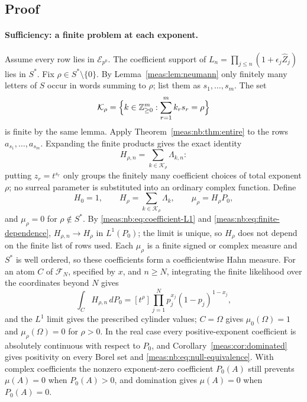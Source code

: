 \documentclass[11pt]{article}
\numberwithin{equation}{section}
\theoremstyle{definition}
\theoremstyle{remark}
\newcommand{\Z}{\mathbb Z}
\newcommand{\coef}[2]{[t^{#1}]#2}
\newcommand{\Zh}{\widehat Z}
\newcommand{\Erow}{\mathcal E_{p^0}}
\begin{document}
\subsection{Proof}

\paragraph{Sufficiency: a finite problem at each exponent.} Assume every row lies
in $\Erow$. The coefficient support of $L_n=\prod_{j\le n}(1+\epsilon_j\Zh_j)$ lies in
$S^*$. Fix $\rho\in S^*\setminus\{0\}$. By Lemma~\ref{meas:lem:neumann} only finitely
many letters of $S$ occur in words summing to $\rho$; list them as
$s_1,\ldots,s_m$. The set
\begin{equation}\label{meas:nb:eq:K-rho}
 \mathcal K_\rho=\Bigl\{k\in\Z_{\ge0}^m:\sum_{r=1}^mk_rs_r=\rho\Bigr\}
\end{equation}
is finite by the same lemma. Apply Theorem~\ref{meas:nb:thm:entire} to the rows
$a_{s_1},\ldots,a_{s_m}$. Expanding the finite products gives the exact identity
\begin{equation}\label{meas:nb:eq:finite-dependence}
 H_{\rho,n}=\sum_{k\in\mathcal K_\rho}\Lambda_{k,n}:
\end{equation}
putting $z_r=t^{s_r}$ only groups the finitely many coefficient choices of total
exponent $\rho$; no surreal parameter is substituted into an ordinary complex
function. Define
\begin{equation}\label{meas:nb:eq:H-construction}
 H_0=1,\qquad H_\rho=\sum_{k\in\mathcal K_\rho}\Lambda_k,\qquad \mu_\rho=H_\rho P_0,
\end{equation}
and $\mu_\rho=0$ for $\rho\notin S^*$. By \eqref{meas:nb:eq:coefficient-L1} and
\eqref{meas:nb:eq:finite-dependence}, $H_{\rho,n}\to H_\rho$ in $L^1(P_0)$; the limit is
unique, so $H_\rho$ does not depend on the finite list of rows used. Each $\mu_\rho$ is
a finite signed or complex measure and $S^*$ is well ordered, so these coefficients
form a coefficientwise Hahn measure. For an atom $C$ of $\mathcal F_N$, specified by
$x$, and $n\ge N$, integrating the finite likelihood over the coordinates beyond $N$
gives
\[
 \int_CH_{\rho,n}\,dP_0=\coef{\rho}{\prod_{j=1}^Np_j^{x_j}(1-p_j)^{1-x_j}},
\]
and the $L^1$ limit gives the prescribed cylinder values; $C=\Omega$ gives
$\mu_0(\Omega)=1$ and $\mu_\rho(\Omega)=0$ for $\rho>0$. In the real case every
positive-exponent coefficient is absolutely continuous with respect to $P_0$, and
Corollary~\ref{meas:cor:dominated} gives positivity on every Borel set and
\eqref{meas:nb:eq:null-equivalence}. With complex coefficients the nonzero
exponent-zero coefficient $P_0(A)$ still prevents $\mu(A)=0$ when $P_0(A)>0$, and
domination gives $\mu(A)=0$ when $P_0(A)=0$.
\end{document}
